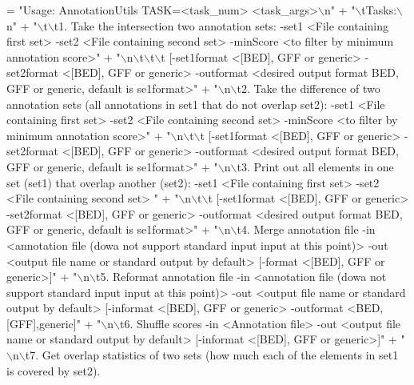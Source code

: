 \begin{DoxyCode}
= \textcolor{stringliteral}{"Usage: AnnotationUtils TASK=<task\_num> <task\_args>\(\backslash\)n"} +
    \textcolor{stringliteral}{"\(\backslash\)tTasks:\(\backslash\)n"} +
    \textcolor{stringliteral}{"\(\backslash\)t\(\backslash\)t1. Take the intersection two annotation sets: -set1 <File containing first set>  -set2 <File
       containing second set> -minScore <to filter by minimum annotation score>"} +
    \textcolor{stringliteral}{"\(\backslash\)n\(\backslash\)t\(\backslash\)t\(\backslash\)t [-set1format <[BED], GFF or generic> -set2format <[BED], GFF or generic> -outformat <desired
       output format BED, GFF or generic, default is se1format>"} +
    \textcolor{stringliteral}{"\(\backslash\)n\(\backslash\)t2. Take the difference of two annotation sets (all annotations in set1 that do not overlap set2):
       -set1 <File containing first set>  -set2 <File containing second set>  -minScore <to filter by minimum
       annotation score>"} +
    \textcolor{stringliteral}{"\(\backslash\)n\(\backslash\)t\(\backslash\)t [-set1format <[BED], GFF or generic> -set2format <[BED], GFF or generic> -outformat <desired
       output format BED, GFF or generic, default is se1format>"} +
    \textcolor{stringliteral}{"\(\backslash\)n\(\backslash\)t3. Print out all elements in one set (set1) that overlap another (set2): -set1 <File containing
       first set>  -set2 <File containing second set> "} +
    \textcolor{stringliteral}{"\(\backslash\)n\(\backslash\)t\(\backslash\)t [-set1format <[BED], GFF or generic> -set2format <[BED], GFF or generic> -outformat <desired
       output format BED, GFF or generic, default is se1format>"} +
    \textcolor{stringliteral}{"\(\backslash\)n\(\backslash\)t4. Merge annotation file -in <annotation file (dowa not support standard input input at this
       point)> -out <output file name or standard output by default> [-format <[BED], GFF or generic>]"} +
    \textcolor{stringliteral}{"\(\backslash\)n\(\backslash\)t5. Reformat annotation file  -in <annotation file (dowa not support standard input input at this
       point)> -out <output file name or standard output by default> [-informat <[BED], GFF or generic> -outformat
       <BED,[GFF],generic]"} +
    \textcolor{stringliteral}{"\(\backslash\)n\(\backslash\)t6. Shuffle scores -in <Annotation file> -out <output file name or standard output by default>
       [-informat <[BED], GFF or generic>]"} +
    \textcolor{stringliteral}{"\(\backslash\)n\(\backslash\)t7. Get overlap statistics of two sets (how much each of the elements in set1 is covered by set2). 
}
\end{DoxyCode}
